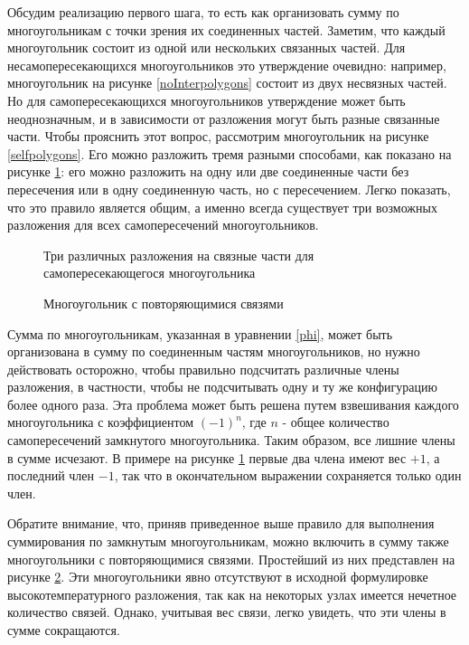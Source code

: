 Обсудим реализацию первого шага, то есть как организовать сумму по многоугольникам с точки зрения их соединенных частей. Заметим, что каждый многоугольник состоит из одной или нескольких связанных частей. Для несамопересекающихся многоугольников это утверждение очевидно: например, многоугольник на рисунке \ref{noInterpolygons} состоит из двух несвязных частей. Но для самопересекающихся многоугольников утверждение может быть неоднозначным, и в зависимости от разложения могут быть разные связанные части. Чтобы прояснить этот вопрос, рассмотрим многоугольник на рисунке \ref{selfpolygons}. Его можно разложить тремя разными способами, как показано на рисунке \ref{threeVarPoly}: его можно разложить на одну или две соединенные части без пересечения или в одну соединенную часть, но с пересечением. Легко показать, что это правило является общим, а именно всегда существует три возможных разложения для всех самопересечений многоугольников. 

 \begin{figure}[h]
 	\caption{Три различных разложения на связные части для самопересекающегося многоугольника}
 	\label{threeVarPoly}
 \end{figure}

 \begin{figure}[h]
 	\caption{Многоугольник с повторяющимися связями}
 	\label{PolyRepeatBonds}
 \end{figure}

Сумма по многоугольникам, указанная в уравнении \eqref{phi}, может быть организована в сумму по соединенным частям многоугольников, но нужно действовать осторожно, чтобы правильно подсчитать различные члены разложения, в частности, чтобы не подсчитывать одну и ту же конфигурацию более одного раза. Эта проблема может быть решена путем взвешивания каждого многоугольника с коэффициентом $(-1)^n$, где $n$ - общее количество самопересечений замкнутого многоугольника. Таким образом, все лишние члены в сумме исчезают. В примере на рисунке \ref{threeVarPoly} первые два члена имеют вес $+1$, а последний член $-1$, так что в окончательном выражении сохраняется только один член.

Обратите внимание, что, приняв приведенное выше правило для выполнения суммирования по замкнутым многоугольникам, можно включить в сумму также многоугольники с повторяющимися связями. Простейший из них представлен на рисунке \ref{PolyRepeatBonds}. Эти многоугольники явно отсутствуют в исходной формулировке высокотемпературного разложения, так как на некоторых узлах имеется нечетное количество связей. Однако, учитывая вес связи, легко увидеть, что эти члены в сумме сокращаются.

